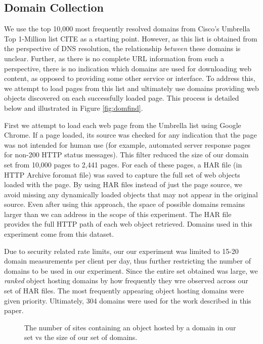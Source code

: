 \subsection{Domain Collection}

We use the top 10,000 most frequently resolved domains from Cisco's Umbrella Top
1-Million list CITE as a starting point. However, as this list is obtained from
the perspective of DNS resolution, the relationship \emph{between} these domains
is unclear. Further, as there is no complete URL information from such a
perspective, there is no indication which domains are used for downloading web
content, as opposed to providing some other service or interface. To address
this, we attempt to load pages from this list and ultimately use domains
providing web objects discovered on each successfully loaded page. This process
is detailed below and illustrated in Figure \ref{fig:domfind}.

First we attempt to load each web page from the Umbrella list using Google
Chrome. If a page loaded, its source was checked for any indication that the
page was not intended for human use (for example, automated server response
pages for non-200 HTTP status messages). This filter reduced the size of our
domain set from 10,000 pages to 2,441 pages. For each of these pages, a HAR file
(in HTTP Archive foromat file) was saved to capture the full set of web objects
loaded with the page. By using HAR files instead of just the page source, we
avoid missing any dynamically loaded objects that may not appear in the original
source. Even after using this approach, the space of possible domains remains larger
than we can address in the scope of this experiment. The HAR file provides the
full HTTP path of each web object retrieved. Domains used in this experiment
come from this dataset. 

Due to security related rate limits, our our experiment was limited to 15-20 domain measurements per
client per day, thus further restricting the number of domains to be used in our
experiment. Since the entire set obtained was large, we \emph{ranked}
object hosting domains by how frequently they wre observed across our set of HAR
files. The most frequently appearing object hosting domains were given priority.
Ultimately, 304 domains were used for the work described in this paper. 

\begin{figure}
    \caption{The number of sites containing an object hosted by a domain in our set vs
    the size of our set of domains.}
    \label{fig:sitescovered}
\end{figure}

